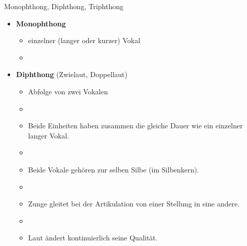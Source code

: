 \begin{frame}{Monophthong, Diphthong, Triphthong}

\begin{itemize}
	\item \textbf{Monophthong}

	\begin{itemize}		
		\item einzelner (langer oder kurzer) Vokal
		\item[]
	\end{itemize}
	
	\item \textbf{Diphthong} (Zwielaut, Doppellaut)
	
	\begin{itemize}		
		\item Abfolge von zwei Vokalen
		\item[]
		\item Beide Einheiten haben zusammen die gleiche Dauer wie ein einzelner langer Vokal.
		\item[]
		\item Beide Vokale gehören zur selben Silbe (im Silbenkern).
		\item[]
		\item Zunge gleitet bei der Artikulation von einer Stellung in eine andere.
		\item[]
		\item Laut ändert kontinuierlich seine Qualität.
	\end{itemize}
	
\end{itemize}	

\end{frame}



